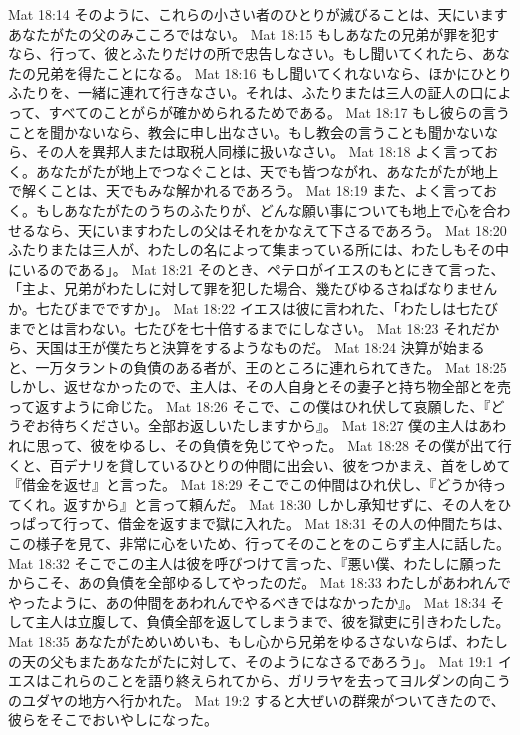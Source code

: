 Mat 18:14  そのように、これらの小さい者のひとりが滅びることは、天にいますあなたがたの父のみこころではない。
Mat 18:15  もしあなたの兄弟が罪を犯すなら、行って、彼とふたりだけの所で忠告しなさい。もし聞いてくれたら、あなたの兄弟を得たことになる。
Mat 18:16  もし聞いてくれないなら、ほかにひとりふたりを、一緒に連れて行きなさい。それは、ふたりまたは三人の証人の口によって、すべてのことがらが確かめられるためである。
Mat 18:17  もし彼らの言うことを聞かないなら、教会に申し出なさい。もし教会の言うことも聞かないなら、その人を異邦人または取税人同様に扱いなさい。
Mat 18:18  よく言っておく。あなたがたが地上でつなぐことは、天でも皆つながれ、あなたがたが地上で解くことは、天でもみな解かれるであろう。
Mat 18:19  また、よく言っておく。もしあなたがたのうちのふたりが、どんな願い事についても地上で心を合わせるなら、天にいますわたしの父はそれをかなえて下さるであろう。
Mat 18:20  ふたりまたは三人が、わたしの名によって集まっている所には、わたしもその中にいるのである」。
Mat 18:21  そのとき、ペテロがイエスのもとにきて言った、「主よ、兄弟がわたしに対して罪を犯した場合、幾たびゆるさねばなりませんか。七たびまでですか」。
Mat 18:22  イエスは彼に言われた、「わたしは七たびまでとは言わない。七たびを七十倍するまでにしなさい。
Mat 18:23  それだから、天国は王が僕たちと決算をするようなものだ。
Mat 18:24  決算が始まると、一万タラントの負債のある者が、王のところに連れられてきた。
Mat 18:25  しかし、返せなかったので、主人は、その人自身とその妻子と持ち物全部とを売って返すように命じた。
Mat 18:26  そこで、この僕はひれ伏して哀願した、『どうぞお待ちください。全部お返しいたしますから』。
Mat 18:27  僕の主人はあわれに思って、彼をゆるし、その負債を免じてやった。
Mat 18:28  その僕が出て行くと、百デナリを貸しているひとりの仲間に出会い、彼をつかまえ、首をしめて『借金を返せ』と言った。
Mat 18:29  そこでこの仲間はひれ伏し、『どうか待ってくれ。返すから』と言って頼んだ。
Mat 18:30  しかし承知せずに、その人をひっぱって行って、借金を返すまで獄に入れた。
Mat 18:31  その人の仲間たちは、この様子を見て、非常に心をいため、行ってそのことをのこらず主人に話した。
Mat 18:32  そこでこの主人は彼を呼びつけて言った、『悪い僕、わたしに願ったからこそ、あの負債を全部ゆるしてやったのだ。
Mat 18:33  わたしがあわれんでやったように、あの仲間をあわれんでやるべきではなかったか』。
Mat 18:34  そして主人は立腹して、負債全部を返してしまうまで、彼を獄吏に引きわたした。
Mat 18:35  あなたがためいめいも、もし心から兄弟をゆるさないならば、わたしの天の父もまたあなたがたに対して、そのようになさるであろう」。
Mat 19:1  イエスはこれらのことを語り終えられてから、ガリラヤを去ってヨルダンの向こうのユダヤの地方へ行かれた。
Mat 19:2  すると大ぜいの群衆がついてきたので、彼らをそこでおいやしになった。
